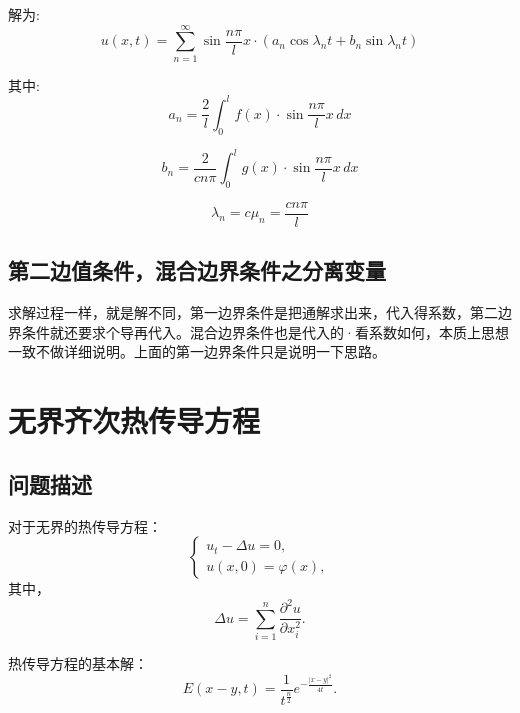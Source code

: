 \documentclass[12pt,a4paper]{article}
\numberwithin{subsection}{section}   %
\numberwithin{subsubsection}{subsection}
\theoremstyle{plain}
\theoremstyle{definition}
\theoremstyle{remark}
\theoremstyle{remark}
\begin{document}
	解为:
	\begin{equation}
		u(x, t) = \sum_{n=1}^{\infty} \sin \frac{n\pi}{l} x \cdot \left( a_n \cos \lambda_n t + b_n \sin \lambda_n t \right)
	\end{equation}
	
	其中:
	\begin{equation}
		a_n = \frac{2}{l} \int_0^l f(x) \cdot \sin \frac{n\pi}{l} x \, dx
	\end{equation}
	
	\begin{equation}
		b_n = \frac{2}{c n \pi} \int_0^l g(x) \cdot \sin \frac{n\pi}{l} x \, dx
	\end{equation}
	
	\begin{equation}
		\lambda_n = c \mu_n = \frac{c n \pi}{l}
	\end{equation}
	
		\subsection{第二边值条件，混合边界条件之分离变量}
求解过程一样，就是解不同，第一边界条件是把通解求出来，代入得系数，第二边界条件就还要求个导再代入。混合边界条件也是代入的·看系数如何，本质上思想一致不做详细说明。上面的第一边界条件只是说明一下思路。
	
	
		\newpage
	\section{无界齐次热传导方程}
	\subsection{问题描述}
	对于无界的热传导方程：
	\begin{equation}
		\begin{cases}\label{wujierechuandao}
			u_t - \Delta u = 0, \\
			u(x, 0) = \varphi(x),
		\end{cases}
	\end{equation}
	其中，
	\begin{equation}
		\Delta u = \sum_{i=1}^n \frac{\partial^2 u}{\partial x_i^2}.
	\end{equation}
	
	热传导方程的基本解：
	\begin{equation}
		E(x - y, t) = \frac{1}{t^{\frac{n}{2}}} e^{-\frac{|x - y|^2}{4t}}.
	\end{equation}
	
\end{document}
